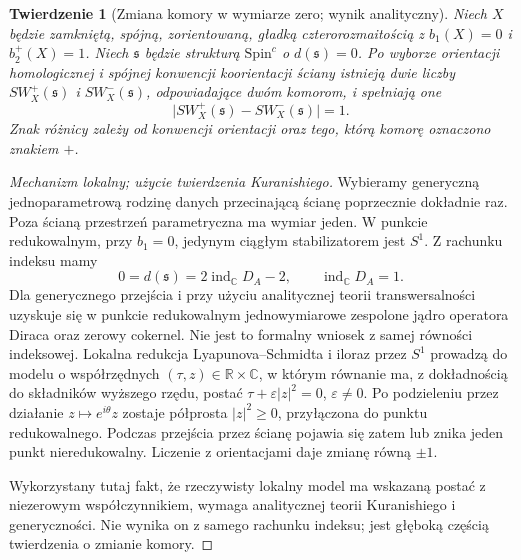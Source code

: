 \documentclass[11pt,a4paper]{report}
\numberwithin{equation}{section}
\theoremstyle{plain}
\newtheorem{twierdzenie}{Twierdzenie}[section]
\theoremstyle{definition}
\theoremstyle{remark}
\begin{document}
\begin{twierdzenie}[Zmiana komory w wymiarze zero; wynik analityczny]
\label{thm:tg-sw-wallcross}
Niech $X$ będzie zamkniętą, spójną, zorientowaną,
gładką czterorozmaitością z $b_1(X)=0$ i $b_2^+(X)=1$.
Niech $\mathfrak s$ będzie strukturą $\mathrm{Spin}^c$
o $d(\mathfrak s)=0$. Po wyborze orientacji homologicznej
i spójnej konwencji koorientacji ściany istnieją dwie
liczby $SW_X^+(\mathfrak s)$ i $SW_X^-(\mathfrak s)$,
odpowiadające dwóm komorom, i spełniają one
\[
\bigl|SW_X^+(\mathfrak s)-SW_X^-(\mathfrak s)\bigr|=1.
\]
Znak różnicy zależy od konwencji orientacji oraz tego,
którą komorę oznaczono znakiem $+$.
\end{twierdzenie}

\begin{proof}[Mechanizm lokalny; użycie twierdzenia Kuranishiego]
Wybieramy generyczną jednoparametrową rodzinę danych
przecinającą ścianę poprzecznie dokładnie raz.
Poza ścianą przestrzeń parametryczna ma wymiar jeden.
W punkcie redukowalnym, przy $b_1=0$, jedynym ciągłym
stabilizatorem jest $S^1$. Z rachunku indeksu mamy
\[
0=d(\mathfrak s)=2\operatorname{ind}_{\mathbb C}D_A-2,
\qquad\operatorname{ind}_{\mathbb C}D_A=1.
\]
Dla generycznego przejścia i przy użyciu analitycznej
teorii transwersalności uzyskuje się w punkcie redukowalnym
jednowymiarowe zespolone jądro operatora Diraca oraz
zerowy cokernel. Nie jest to formalny wniosek z samej
równości indeksowej. Lokalna redukcja Lyapunova--Schmidta
i iloraz przez $S^1$ prowadzą do modelu o współrzędnych
$(\tau,z)\in\mathbb R\times\mathbb C$, w którym równanie
ma, z dokładnością do składników wyższego rzędu, postać
$\tau+\varepsilon|z|^2=0$, $\varepsilon\ne0$.
Po podzieleniu przez działanie $z\mapsto e^{i\theta}z$
zostaje półprosta $|z|^2\geq0$, przyłączona do punktu
redukowalnego. Podczas przejścia przez ścianę
pojawia się zatem lub znika jeden punkt nieredukowalny.
Liczenie z orientacjami daje zmianę równą $\pm1$.

Wykorzystany tutaj fakt, że rzeczywisty lokalny model
ma wskazaną postać z niezerowym współczynnikiem,
wymaga analitycznej teorii Kuranishiego i generyczności.
Nie wynika on z samego rachunku indeksu; jest głęboką
częścią twierdzenia o zmianie komory.
\end{proof}
\end{document}
